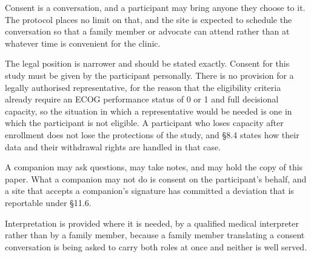 Consent is a conversation, and a participant may bring anyone they choose to it.
The protocol places no limit on that, and the site is expected to schedule the
conversation so that a family member or advocate can attend rather than at
whatever time is convenient for the clinic.

The legal position is narrower and should be stated exactly. Consent for this
study must be given by the participant personally. There is no provision for a
legally authorised representative, for the reason that the eligibility criteria
already require an ECOG performance status of 0 or 1 and full decisional
capacity, so the situation in which a representative would be needed is one in
which the participant is not eligible. A participant who loses capacity after
enrollment does not lose the protections of the study, and \S 8.4 states how
their data and their withdrawal rights are handled in that case.

A companion may ask questions, may take notes, and may hold the copy of this
paper. What a companion may not do is consent on the participant's behalf, and a
site that accepts a companion's signature has committed a deviation that is
reportable under \S 11.6.

Interpretation is provided where it is needed, by a qualified medical
interpreter rather than by a family member, because a family member translating
a consent conversation is being asked to carry both roles at once and neither is
well served.
